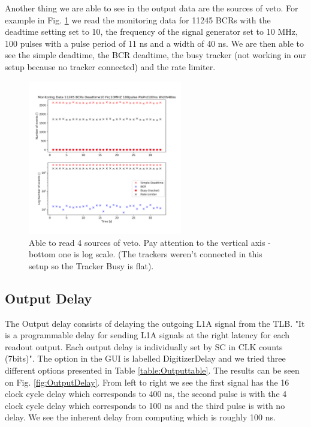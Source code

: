 Another thing we are able to see in the output data are the sources of veto. For example in Fig. \ref{fig:VetoSources} we read the monitoring data for 11245 BCRs with the deadtime setting set to 10, the frequency of the signal generator set to 10 MHz, 100 pulses with a pulse period of 11 ns and a width of 40 ns. We are then able to see the simple deadtime, the BCR deadtime, the busy tracker (not working in our setup because no tracker connected) and the rate limiter.

\begin{figure}[htbp!] 
\centering    
\includegraphics[width=0.6\textwidth]{MonitoringData11245HzDeadtime10Frq10MHZ100pulsePlsPrd100nsWidth40ns.png}
\caption[Veto sources]{Able to read 4 sources of veto. Pay attention to the vertical axis - bottom one is log scale. (The trackers weren't connected in this setup so the Tracker Busy is flat).}
\label{fig:VetoSources}
\end{figure}

\subsection{Output Delay}

The Output delay consists of delaying the outgoing L1A signal from the TLB. "It is a programmable delay for sending L1A signals at the right latency for each readout output. Each output delay is individually set by SC in CLK counts (7bits)". The option in the GUI is labelled DigitizerDelay and we tried three different options presented in Table \ref{table:Outputtable}. The results can be seen on Fig. \ref{fig:OutputDelay}. From left to right we see the first signal has the 16 clock cycle delay which corresponds to 400 ns, the second pulse is with the 4 clock cycle delay which corresponds to 100 ns and the third pulse is with no delay. We see the inherent delay from computing which is roughly 100 ns.


